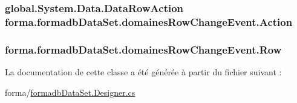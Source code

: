\subsubsection[{\texorpdfstring{Action}{Action}}]{\setlength{\rightskip}{0pt plus 5cm}global.\+System.\+Data.\+Data\+Row\+Action forma.\+formadb\+Data\+Set.\+domaines\+Row\+Change\+Event.\+Action\hspace{0.3cm}{\ttfamily [get]}}\hypertarget{classforma_1_1formadb_data_set_1_1domaines_row_change_event_abc2bec70ce04a769a38422f70f8dc83f}{}\label{classforma_1_1formadb_data_set_1_1domaines_row_change_event_abc2bec70ce04a769a38422f70f8dc83f}
\subsubsection[{\texorpdfstring{Row}{Row}}]{ forma.\+formadb\+Data\+Set.\+domaines\+Row\+Change\+Event.\+Row\hspace{0.3cm}{\ttfamily [get]}}\hypertarget{classforma_1_1formadb_data_set_1_1domaines_row_change_event_ac94213c15c74286ebe675a5594d23e00}{}\label{classforma_1_1formadb_data_set_1_1domaines_row_change_event_ac94213c15c74286ebe675a5594d23e00}


La documentation de cette classe a été générée à partir du fichier suivant \+:\begin{DoxyCompactItemize}
\item 
forma/\hyperlink{formadb_data_set_8_designer_8cs}{formadb\+Data\+Set.\+Designer.\+cs}\end{DoxyCompactItemize}
